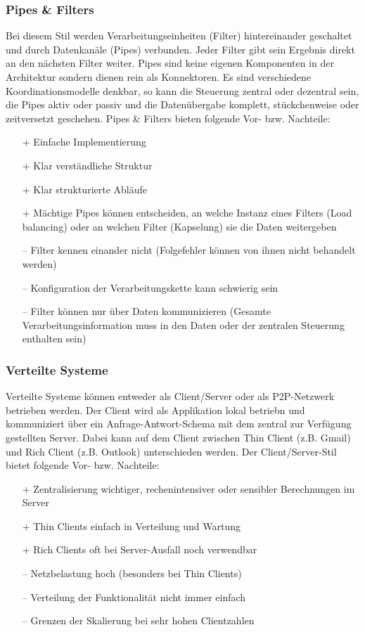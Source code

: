 \subsubsection{Pipes \& Filters}

Bei diesem Stil werden Verarbeitungseinheiten (Filter) hintereinander geschaltet und durch Datenkanäle (Pipes) verbunden. Jeder Filter gibt sein Ergebnis direkt an den nächsten Filter weiter. Pipes sind keine eigenen Komponenten in der Architektur sondern dienen rein als Konnektoren. Es sind verschiedene Koordinationsmodelle denkbar, so kann die Steuerung zentral oder dezentral sein, die Pipes aktiv oder passiv und die Datenübergabe komplett, stückchenweise oder zeitversetzt geschehen. Pipes \& Filters bieten folgende Vor- bzw. Nachteile:
\begin{itemize}
	\item[+] Einfache Implementierung
	\item[+] Klar verständliche Struktur
	\item[+] Klar strukturierte Abläufe
	\item[+] Mächtige Pipes können entscheiden, an welche Instanz eines Filters (Load balancing) oder an welchen Filter (Kapselung) sie die Daten weitergeben
	\item[--] Filter kennen einander nicht (Folgefehler können von ihnen nicht behandelt werden)
	\item[--] Konfiguration der Verarbeitungskette kann schwierig sein
	\item[--] Filter können nur über Daten kommunizieren (Gesamte Verarbeitungsinformation muss in den Daten oder der zentralen Steuerung enthalten sein)
\end{itemize}

\subsubsection{Verteilte Systeme}

Verteilte Systeme können entweder als Client/Server oder als P2P-Netzwerk betrieben werden. Der Client wird als Applikation lokal betriebn und kommuniziert über ein Anfrage-Antwort-Schema mit dem zentral zur Verfügung gestellten Server. Dabei kann auf dem Client zwischen Thin Client (z.B. Gmail) und Rich Client (z.B. Outlook) unterschieden werden. Der Client/Server-Stil bietet folgende Vor- bzw. Nachteile:
\begin{itemize}
	\item[+] Zentralisierung wichtiger, rechenintensiver oder sensibler Berechnungen im Server
	\item[+] Thin Clients einfach in Verteilung und Wartung
	\item[+] Rich Clients oft bei Server-Ausfall noch verwendbar
	\item[--] Netzbelastung hoch (besonders bei Thin Clients)
	\item[--] Verteilung der Funktionalität nicht immer einfach
	\item[--] Grenzen der Skalierung bei sehr hohen Clientzahlen
\end{itemize}


